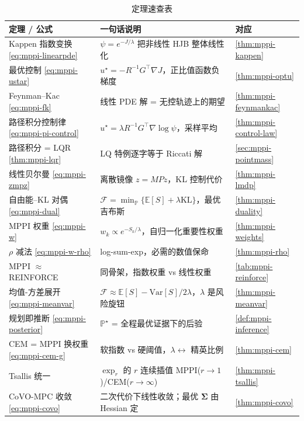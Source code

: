 \begin{table}[H]\centering\small
\caption{定理速查表}
\begin{tabular}{lll}
\toprule
定理 / 公式 & 一句话说明 & 对应 \\
\midrule
Kappen 指数变换 \cref{eq:mppi-linearpde} & $\psi=e^{-J/\lambda}$ 把非线性 HJB 整体线性化 & \cref{thm:mppi-kappen} \\
最优控制 \cref{eq:mppi-ustar} & $u^\star=-R^{-1}G^\top\nabla J$，正比值函数负梯度 & \cref{thm:mppi-optu} \\
Feynman--Kac \cref{eq:mppi-fk} & 线性 PDE 解 = 无控轨迹上的期望 & \cref{thm:mppi-feynmankac} \\
路径积分控制律 \cref{eq:mppi-pi-control} & $u^\star=\lambda R^{-1}G^\top\nabla\log\psi$，采样平均 & \cref{thm:mppi-control-law} \\
路径积分 = LQR \cref{thm:mppi-lqr} & LQ 特例逐字等于 Riccati 解 & \cref{sec:mppi-pointmass} \\
线性贝尔曼 \cref{eq:mppi-zmpz} & 离散镜像 $z=MPz$，KL 控制代价 & \cref{thm:mppi-lmdp} \\
自由能--KL 对偶 \cref{eq:mppi-dual} & $\mathcal{F}=\min_{\mathbb{P}}\{\mathbb{E}[S]+\lambda\mathrm{KL}\}$，最优吉布斯 & \cref{thm:mppi-duality} \\
MPPI 权重 \cref{eq:mppi-w} & $w_k\propto e^{-S_k/\lambda}$，自归一化重要性权重 & \cref{thm:mppi-weights} \\
$\rho$ 减法 \cref{eq:mppi-w-rho} & log-sum-exp，必需的数值保命 & \cref{thm:mppi-rho} \\
MPPI $\approx$ REINFORCE & 同骨架，指数权重 vs 线性权重 & \cref{tab:mppi-reinforce} \\
均值-方差展开 \cref{eq:mppi-meanvar} & $\mathcal{F}\approx\mathbb{E}[S]-\mathrm{Var}[S]/2\lambda$，$\lambda$ 是风险旋钮 & \cref{thm:mppi-meanvar} \\
规划即推断 \cref{eq:mppi-posterior} & $\mathbb{P}^\star$ = 全程最优证据下的后验 & \cref{def:mppi-inference} \\
CEM = MPPI 换权重 \cref{eq:mppi-cem-g} & 软指数 vs 硬阈值，$\lambda\leftrightarrow$ 精英比例 & \cref{thm:mppi-cem} \\
Tsallis 统一 & $\exp_r$ 的 $r$ 连续插值 MPPI($r{\to}1$)/CEM($r{\to}\infty$) & \cref{thm:mppi-tsallis} \\
CoVO-MPC 收敛 \cref{eq:mppi-covo} & 二次代价下线性收敛；最优 $\boldsymbol{\Sigma}$ 由 Hessian 定 & \cref{thm:mppi-covo} \\
\bottomrule
\end{tabular}
\end{table}

